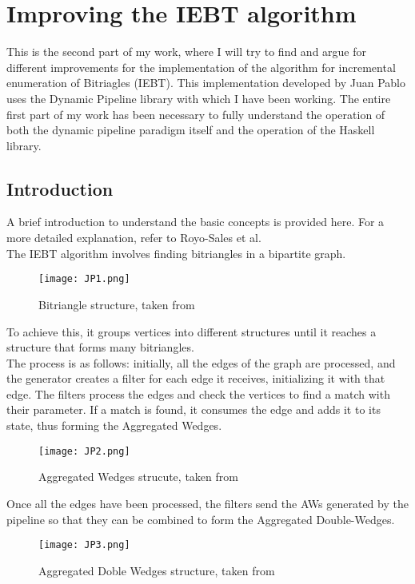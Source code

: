 \chapter{Improving the IEBT algorithm} \label{IEBT}
This is the second part of my work, where I will try to find and argue for different improvements for the implementation of the algorithm for incremental enumeration of Bitriagles (IEBT).
This implementation developed by Juan Pablo uses the Dynamic Pipeline library with which I have been working.
The entire first part of my work has been necessary to fully understand the operation of both the dynamic pipeline paradigm itself and the operation of the Haskell library.

\section{Introduction}
A brief introduction to understand the basic concepts is provided here.
For a more detailed explanation, refer to Royo-Sales et al. \cite[][See chapter 6]{royo_sales_algorithm_2021} \\
The IEBT algorithm involves finding bitriangles in a bipartite graph.
\begin{figure}[H]
  \centering
  \texttt{[image: JP1.png]}
  \caption[{[IEBT] BiTriangle}]{Bitriangle structure, taken from \cite{royo_sales_algorithm_2021}}
  \label{fig:JP1}
\end{figure}
To achieve this, it groups vertices into different structures until it reaches a structure that forms many bitriangles. \\
The process is as follows: initially, all the edges of the graph are processed, and the generator creates a filter for each edge it receives, initializing it with that edge.
The filters process the edges and check the vertices to find a match with their parameter.
If a match is found, it consumes the edge and adds it to its state, thus forming the Aggregated Wedges.
\begin{figure}[H]
  \centering
  \texttt{[image: JP2.png]}
  \caption[{[IEBT] Aggregated Wedges}]{Aggregated Wedges strucute, taken from \cite{royo_sales_algorithm_2021}}
  \label{fig:JP2}
\end{figure}
Once all the edges have been processed, the filters send the AWs generated by the pipeline so that they can be combined to form the Aggregated Double-Wedges.

\begin{figure}[H]
  \centering
  \texttt{[image: JP3.png]}
  \caption[{[IEBT] Aggregated Doble Wedges}]{Aggregated Doble Wedges structure, taken from \cite{royo_sales_algorithm_2021}}
  \label{fig:JP3}
\end{figure}

